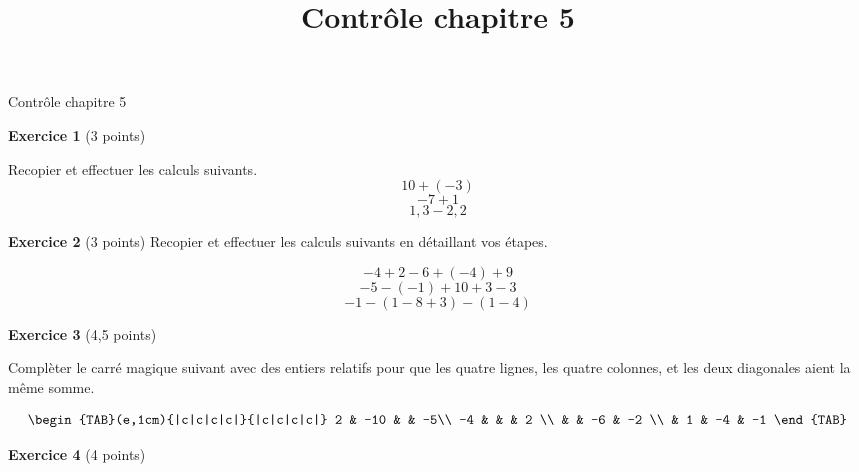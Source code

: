 \documentclass[14pt]{extreport}
\title{Contrôle chapitre 5}
\date{}
\theoremstyle{plain}
\begin{document}
\begin{center}{\Large Contrôle chapitre 5}\\ \end{center}

\textbf{Exercice 1} (3 points)  %

Recopier et effectuer les calculs suivants. 
\[ 10 + (-3) \]
\[ -7 + 1\]
\[ 1,3 - 2,2\]

\textbf{Exercice 2} (3 points) %
Recopier et effectuer les calculs suivants en détaillant vos étapes. 

\[ - 4+ 2 - 6 + (-4) + 9 \]
\[ -5  - (-1) + 10+ 3 - 3\]
\[ -1 - (1 - 8 + 3) - (1 -4)\]




\textbf{Exercice 3} (4,5 points)

Complèter le carré magique suivant avec des entiers relatifs pour que les quatre lignes, les quatre colonnes, 
et les deux diagonales aient la même somme. 


\[
\begin{TAB}(e,1cm){|c|c|c|c|}{|c|c|c|c|}
     2 & -10 &  & -5\\
     -4 &  &  & 2 \\
     &  & -6 & -2 \\
     & 1 & -4 & -1
\end{TAB}
\]

\textbf{Exercice 4} (4 points)%
 
\end{document}
